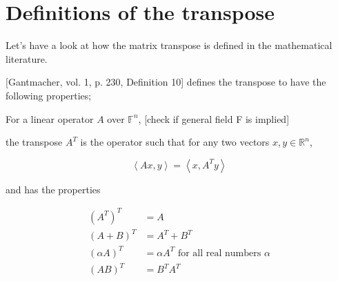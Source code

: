 \section{Definitions of the transpose}

Let's have a look at how the matrix transpose is defined in the mathematical literature.

[Gantmacher, vol. 1, p. 230, Definition 10] defines the transpose to have the following properties;

For a linear operator $A$ over $\mathbb F^n$, [check if general field F is implied]

the transpose $A^T$ is the operator such that for any two vectors $x, y \in \mathbb R^n$,

\[
\left\langle Ax, y \right\rangle = \left\langle x, A^T y \right\rangle
\]

and has the properties

\begin{align}

(A^T)^T & = A \\
(A + B)^T & = A^T + B^T \\
(\alpha A)^T & = \alpha A^T \text{ for all real numbers } \alpha \\
(A B)^T & = B^T A^T

\end{align}
